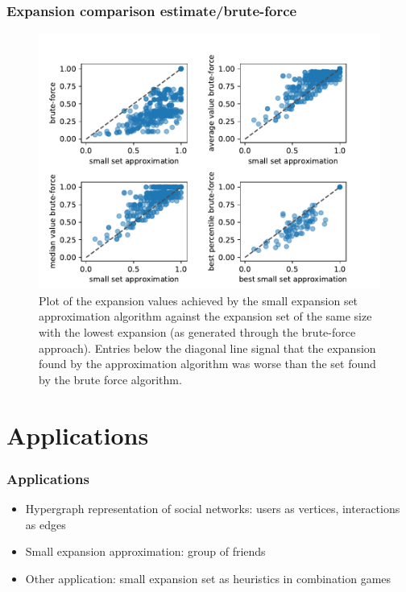 \documentclass{beamer}
\begin{document}
\begin{frame}
\frametitle{Expansion comparison estimate/brute-force}
\begin{figure}
	\centering
	\includegraphics[scale=0.5]{figures/quality_evaluation_log_expansion_values_for_same_number_verticies.pdf}
	\caption[Plot expansions approximation against brute force]{\footnotesize Plot of the expansion values achieved by the small expansion set approximation algorithm against the expansion set of the same size with the lowest expansion (as generated through the brute-force approach). Entries below the diagonal line signal that the expansion found by the approximation algorithm was worse than the set found by the brute force algorithm. \label{fig:expansion_approx_vs_brute}}
\end{figure}
\end{frame}

\section{Applications}
\begin{frame}
\frametitle{Applications}
	\begin{itemize}
		\item Hypergraph representation of social networks: users as vertices, interactions as edges
		\item Small expansion approximation: group of friends
		\item Other application: small expansion set as heuristics in combination games
	\end{itemize}
\end{frame}
	
\end{document}
